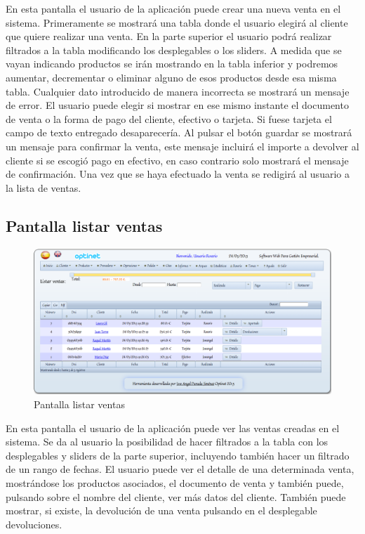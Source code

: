 \documentclass[a4paper,11pt]{book}
\begin{document}
En esta pantalla el usuario de la aplicación puede crear una nueva venta en el sistema. Primeramente se mostrará una tabla donde el usuario elegirá al cliente que quiere realizar una venta. En la parte superior el usuario podrá realizar filtrados a la tabla modificando los desplegables o los sliders. A medida que se vayan indicando productos se irán mostrando en la tabla inferior y podremos aumentar, decrementar o eliminar alguno de esos productos desde esa misma tabla. Cualquier dato introducido de manera incorrecta se mostrará un mensaje de error. El usuario puede elegir si mostrar en ese mismo instante el documento de venta o la forma de pago del cliente, efectivo o tarjeta. Si fuese tarjeta el campo de texto entregado desaparecería. Al pulsar el botón guardar se mostrará un mensaje para confirmar la venta, este mensaje incluirá el importe a devolver al cliente si se escogió pago en efectivo, en caso contrario solo mostrará el mensaje de confirmación. Una vez que se haya efectuado la venta se redigirá al usuario a la lista de ventas.

\subsection {Pantalla listar ventas}

\begin{figure}[!htb]
  \centering
    \includegraphics[scale=0.35]{caplistarventas.png}
  \caption{Pantalla listar ventas}
  \label{a}
\end{figure}

En esta pantalla el usuario de la aplicación puede ver las ventas creadas en el sistema. Se da al usuario la posibilidad de hacer filtrados a la tabla con los desplegables y sliders de la parte superior, incluyendo también hacer un filtrado de un rango de fechas. El usuario puede ver el detalle de una determinada venta, mostrándose los productos asociados, el documento de venta y también puede, pulsando sobre el nombre del cliente, ver más datos del cliente. También puede mostrar, si existe, la devolución de una venta pulsando en el desplegable devoluciones.
\end{document}
